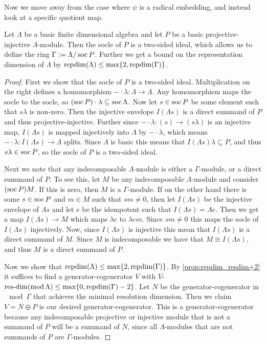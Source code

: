 Now we move away from the case where $\psi$ is a radical embedding, and instead look at a specific quotient map.

\begin{theorem}\cite[Proposition~1.2]{EHIS04}\label{thm:mod_out_socle}
	Let $\Lambda$ be a basic finite dimensional algebra and let $P$ be a basic projective-injective $\Lambda$-module. Then the socle of $P$ is a two-sided ideal, which allows us to define the ring $\Gamma := \Lambda / \operatorname{soc} P$. Further we get a bound on the representation dimension of $\Lambda$ by $\operatorname{repdim}(\Lambda) \leq \max\{2, \operatorname{repdim}(\Gamma)\}$. 
	\begin{proof}
		First we show that the socle of $P$ is a two-sided ideal. Multiplication on the right defines a homomorphism $-\cdot \lambda\colon \Lambda \to \Lambda$. Any homomorphism maps the socle to the socle, so $(\operatorname{soc} P) \cdot \lambda \subseteq \operatorname{soc} \Lambda$. Now let $s \in \operatorname{soc} P$ be some element such that $s\lambda$ is non-zero. Then the injective envelope $I(\Lambda s)$ is a direct summand of $P$ and thus projective-injective. Further since $-\cdot \lambda\colon (s) \to (s\lambda)$ is an injective map, $I(\Lambda s)$ is mapped injectively into $\Lambda$ by $-\cdot \lambda$, which means $-\cdot\lambda\colon I(\Lambda s) \to \Lambda$ splits. Since $\Lambda$ is basic this means that $I(\Lambda s)\lambda \subseteq P$, and thus $s\lambda \in \operatorname{soc} P$, so the socle of $P$ is a two-sided ideal.
		
		Next we note that any indecomposable $\Lambda$-module is either a $\Gamma$-module, or a direct summand of $P$. To see this, let $M$ be any indecomposable $\Lambda$-module and consider $(\operatorname{soc} P)M$. If this is zero, then $M$ is a $\Gamma$-module. If on the other hand there is some $s \in \operatorname{soc} P$ and $m \in M$ such that $sm \neq 0$, then let $I(\Lambda s)$ be the injective envelope of $\Lambda s$ and let $e$ be the idempotent such that $I(\Lambda s) = \Lambda e$. Then we get a map $I(\Lambda s) \to M$ which maps $\lambda e$ to $\lambda e m$. Since $sm \neq 0$ this maps the socle of $I(\Lambda s)$ injectively. Now, since $I(\Lambda s)$ is injective this mean that $I(\Lambda s)$ is a direct summand of $M$. Since $M$ is indecomposable we have that $M \cong I(\Lambda s)$, and thus $M$ is a direct summand of $P$.
		
		Now we show that $\operatorname{repdim}(\Lambda) \leq \max\{2, \operatorname{repdim}(\Gamma)\}$. By \cref{prop:repdim_resdim+2} it suffices to find a generator-cogenerator $V$ with $V$-$\operatorname{res-dim}(\operatorname{mod} \Lambda) \leq \max\{0, \operatorname{repdim}(\Gamma)-2\}$. Let $N$ be the generator-cogenerator in $\mod\Gamma$ that achieves the minimal resolution dimension. Then we claim $V = N \oplus P$ is our desired generator-cogenerator. This is a generator-cogenerator because any indecomposable projective or injective module that is not a summand of $P$ will be  a summand of $N$, since all $\Lambda$-modules that are not summands of $P$ are $\Gamma$-modules.
		

\end{proof}
\end{theorem}
